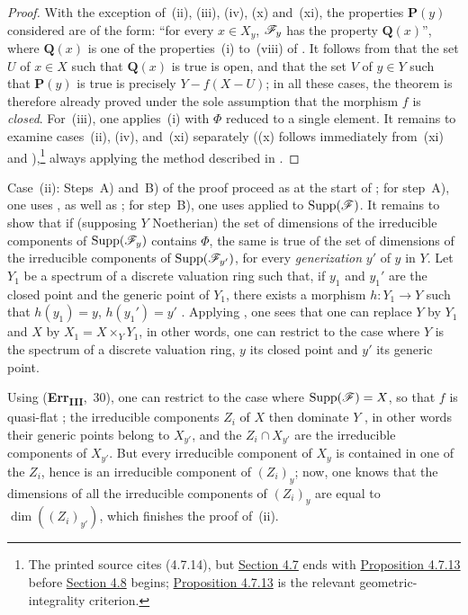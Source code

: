 \begin{proof}
With the exception of~(ii), (iii), (iv), (x) and~(xi), the properties $\mathbf{P}(y)$ considered are of the form: ``for every $x\in X_y$, $\mathscr{F}_y$ has the property $\mathbf{Q}(x)$'', where $\mathbf{Q}(x)$ is one of the properties~(i) to~(viii) of .
It follows from  that the set $U$ of $x\in X$ such that $\mathbf{Q}(x)$ is true is open, and that the set $V$ of $y\in Y$ such that $\mathbf{P}(y)$ is true is precisely $Y-f(X-U)$; in all these cases, the theorem is therefore already proved under the sole assumption that the morphism $f$ is \emph{closed}.
For~(iii), one applies~(i) with $\Phi$ reduced to a single element.
It remains to examine cases~(ii), (iv), and~(xi) separately ((x) follows immediately from~(xi) and ),\footnote{The printed source cites (4.7.14), but {\hyperref[subsection:IV.4.7]{Section 4.7}} ends with {\hyperref[IV.4.7.13]{Proposition 4.7.13}} before {\hyperref[subsection:IV.4.8]{Section 4.8}} begins; {\hyperref[IV.4.7.13]{Proposition 4.7.13}} is the relevant geometric-integrality criterion.} always applying the method described in .
\end{proof}

\begin{env}[12.2.1.1]
\label{IV.12.2.1.1}
Case~(ii): Steps~A) and~B) of the proof proceed as at the start of ; for step~A), one uses ,  as well as ; for step~B), one uses  applied to $\operatorname{Supp}(\mathscr{F})$.
It remains to show that if (supposing $Y$ Noetherian) the set of dimensions of the irreducible components of $\operatorname{Supp}(\mathscr{F}_y)$ contains $\Phi$, the same is true of the set of dimensions of the irreducible components of $\operatorname{Supp}(\mathscr{F}_{y'})$, for every \emph{generization} $y'$ of $y$ in $Y$.
Let $Y_1$ be a spectrum of a discrete valuation ring such that, if $y_1$ and $y_1'$ are the closed point and the generic point of $Y_1$, there exists a morphism $h:Y_1\to Y$ such that $h(y_1)=y$, $h(y_1')=y'$ .
Applying , one sees that one can replace $Y$ by $Y_1$ and $X$ by $X_1=X\times_Y Y_1$, in other words, one can restrict to the case where $Y$ is the spectrum of a discrete valuation ring, $y$ its closed point and $y'$ its generic point.

Using (\textbf{Err}\textsubscript{\textbf{III}},~30), one can restrict to the case where $\operatorname{Supp}(\mathscr{F})=X$, so that $f$ is quasi-flat ; the irreducible components $Z_i$ of $X$ then dominate $Y$ , in other words their generic points belong to $X_{y'}$, and the $Z_i\cap X_{y'}$ are the irreducible components of $X_{y'}$.
But every irreducible component of $X_y$ is contained in one of the $Z_i$, hence is an irreducible component of $(Z_i)_y$; now, one knows  that the dimensions of all the irreducible components of $(Z_i)_y$ are equal to $\dim((Z_i)_{y'})$, which finishes the proof of~(ii).
\end{env}

